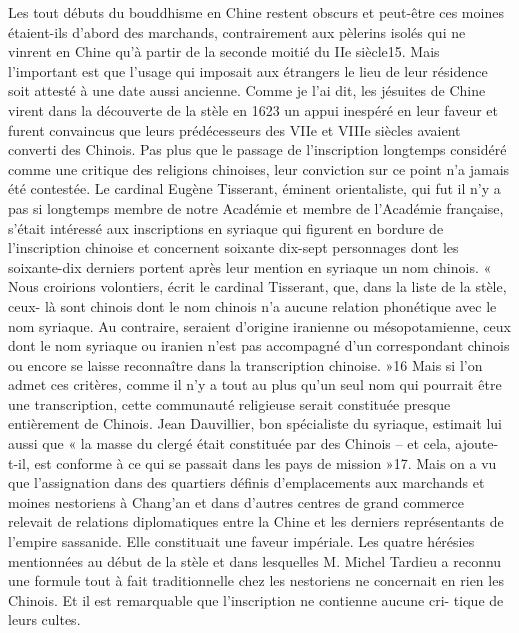 Les tout débuts du bouddhisme en Chine restent obscurs et peut-être ces
moines étaient-ils d'abord des marchands, contrairement aux pèlerins
isolés qui ne vinrent en Chine qu'à partir de la seconde moitié du IIe
siècle15. Mais l'important est que l'usage qui imposait aux étrangers le
lieu de leur résidence soit attesté à une date aussi ancienne.
Comme je l'ai dit, les jésuites de Chine virent dans la découverte de
la stèle en 1623 un appui inespéré en leur faveur et furent convaincus
que leurs prédécesseurs des VIIe et VIIIe siècles avaient converti des
Chinois. Pas plus que le passage de l'inscription longtemps considéré
comme une critique des religions chinoises, leur
conviction sur ce point n'a jamais été contestée. Le cardinal Eugène
Tisserant, éminent orientaliste, qui fut il n'y a pas si longtemps
membre de notre Académie et membre de l'Académie française, s'était
intéressé aux inscriptions en syriaque qui figurent en bordure de
l'inscription chinoise et concernent soixante dix-sept personnages dont
les soixante-dix derniers portent après leur mention en syriaque un nom
chinois. « Nous croirions volontiers, écrit le cardinal Tisserant,
que, dans la liste de la stèle, ceux- là sont chinois dont le nom
chinois n'a aucune relation phonétique avec le nom syriaque. Au
contraire, seraient d'origine iranienne ou mésopotamienne, ceux dont le
nom syriaque ou iranien n'est pas accompagné d'un correspondant chinois
ou encore se laisse reconnaître dans la transcription chinoise. »16 Mais
si l'on admet ces critères, comme il n'y a tout au plus qu'un seul nom
qui pourrait être une transcription, cette communauté religieuse serait
constituée presque entièrement de Chinois. Jean Dauvillier, bon
spécialiste du syriaque, estimait lui aussi que « la masse du clergé
était constituée par des Chinois -- et cela, ajoute- t-il, est conforme
à ce qui se passait dans les pays de mission »17. Mais on a vu que
l'assignation dans des quartiers définis d'emplacements aux marchands
et moines nestoriens à Chang'an et dans d'autres centres de grand
commerce relevait de relations diplomatiques entre la Chine et les
derniers représentants de l'empire sassanide. Elle constituait une
faveur impériale. Les quatre hérésies mentionnées au début de la stèle
et dans lesquelles M. Michel Tardieu a reconnu une formule tout à fait
traditionnelle chez les nestoriens ne concernait en rien les Chinois.
Et il est remarquable que l'inscription ne contienne aucune cri-
tique de leurs cultes.

